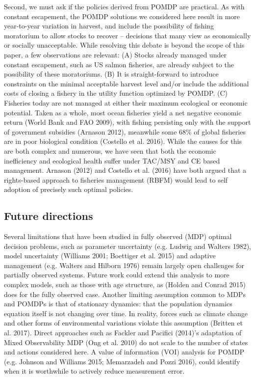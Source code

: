 \documentclass[3p]{elsarticle} %
\begin{document}
Second, we must ask if the policies derived from POMDP are practical. As
with constant escapement, the POMDP solutions we considered here result
in more year-to-year variation in harvest, and include the possibility
of fishing moratorium to allow stocks to recover -- decisions that many
view as economically or socially unacceptable. While resolving this
debate is beyond the scope of this paper, a few observations are
relevant: (A) Stocks already managed under constant escapement, such as
US salmon fisheries, are already subject to the possibility of these
moratoriums. (B) It is straight-forward to introduce constraints on the
minimal acceptable harvest level and/or include the additional costs of
closing a fishery in the utility function optimized by POMDP. (C)
Fisheries today are not managed at either their maximum ecological or
economic potential. Taken as a whole, most ocean fisheries yield a net
negative economic return (World Bank and FAO 2009), with fishing
persisting only with the support of government subsidies (Arnason 2012),
meanwhile some 68\% of global fisheries are in poor biological condition
(Costello et al. 2016). While the causes for this are both complex and
numerous, we have seen that both the economic inefficiency and
ecological health suffer under TAC/MSY and CE based management. Arnason
(2012) and Costello et al. (2016) have both argued that a rights-based
approach to fisheries management (RBFM) would lead to self adoption of
precisely such optimal policies.

\hypertarget{future-directions}{%
\subsection{Future directions}\label{future-directions}}

Several limitations that have been studied in fully observed (MDP)
optimal decision problems, such as parameter uncertainty (e.g. Ludwig
and Walters 1982), model uncertainty (Williams 2001; Boettiger et al.
2015) and adaptive management (e.g. Walters and Hilborn 1976) remain
largely open challenges for partially observed systems. Future work
could extend this analysis to more complex models, such as those with
age structure, as (Holden and Conrad 2015) does for the fully observed
case. Another limiting assumption common to MDPs and POMDPs is that of
stationary dynamics: that the population dynamics equation itself is not
changing over time. In reality, forces such as climate change and other
forms of environmental variations violate this assumption (Britten et
al. 2017). Direct approaches such as Fackler and Pacifici (2014)'s
adaptation of Mixed Observability MDP (Ong et al. 2010) do not scale to
the number of states and actions considered here. A value of information
(VOI) analysis for POMDP (e.g. Johnson and Williams 2015; Memarzadeh and
Pozzi 2016), could identify when it is worthwhile to actively reduce
measurement error.
\end{document}
